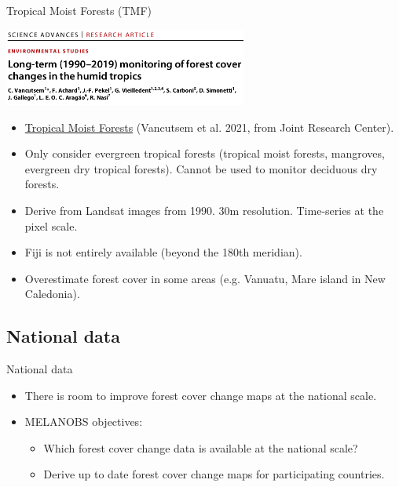\documentclass[10pt,table,dvipsnames,compress]{beamer}
\begin{document}
\begin{frame}[label={sec:org045507c}]{Tropical Moist Forests (TMF)}
\begin{center}
\includegraphics[width=8cm]{figs/fcc/Vancutsem2021.png}
\end{center}

\begin{itemize}
\item \href{https://forobs.jrc.ec.europa.eu/TMF}{Tropical Moist Forests} (Vancutsem et al. 2021, from Joint Research Center).
\item Only consider evergreen tropical forests (tropical moist forests, mangroves, evergreen dry tropical forests). Cannot be used to monitor deciduous dry forests.
\item Derive from Landsat images from 1990. 30m resolution. Time-series at the pixel scale.
\item Fiji is not entirely available (beyond the 180th meridian).
\item Overestimate forest cover in some areas (e.g. Vanuatu, Mare island in New Caledonia).
\end{itemize}
\end{frame}

\subsection{National data}
\label{sec:org379803a}

\begin{frame}[label={sec:org9f2051a}]{National data}
\begin{itemize}
\item There is room to improve forest cover change maps at the national scale.

\item MELANOBS objectives:
\begin{itemize}
\item Which forest cover change data is available at the national scale?
\item Derive up to date forest cover change maps for participating countries.
\end{itemize}
\end{itemize}
\end{frame}
\end{document}
